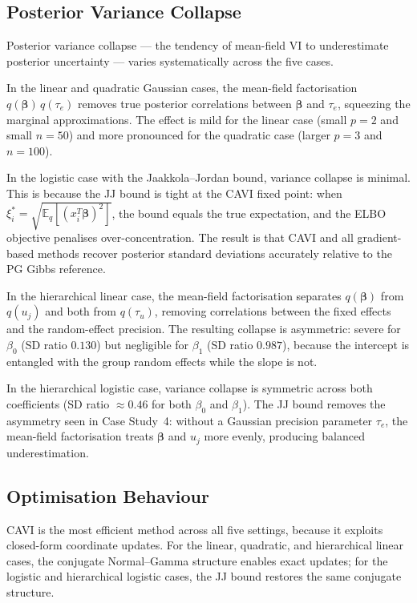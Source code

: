 \documentclass[11pt,a4paper]{article}
\newcommand{\E}{\mathbb{E}}
\begin{document}
\subsection{Posterior Variance Collapse}

Posterior variance collapse --- the tendency of mean-field VI to underestimate posterior
uncertainty --- varies systematically across the five cases.

In the linear and quadratic Gaussian cases, the mean-field factorisation
$q(\bm{\beta})\,q(\tau_e)$ removes true posterior correlations between $\bm{\beta}$ and
$\tau_e$, squeezing the marginal approximations.
The effect is mild for the linear case (small $p=2$ and small $n=50$) and more pronounced
for the quadratic case (larger $p=3$ and $n=100$).

In the logistic case with the Jaakkola--Jordan bound, variance collapse is minimal.
This is because the JJ bound is tight at the CAVI fixed point: when
$\xi_i^* = \sqrt{\E_q[(x_i^T\bm{\beta})^2]}$, the bound equals the true expectation,
and the ELBO objective penalises over-concentration.
The result is that CAVI and all gradient-based methods recover posterior standard
deviations accurately relative to the PG Gibbs reference.

In the hierarchical linear case, the mean-field factorisation separates $q(\bm{\beta})$
from $q(u_j)$ and both from $q(\tau_u)$, removing correlations between the fixed
effects and the random-effect precision.
The resulting collapse is asymmetric: severe for $\beta_0$ (SD ratio $0.130$) but
negligible for $\beta_1$ (SD ratio $0.987$), because the intercept is entangled
with the group random effects while the slope is not.

In the hierarchical logistic case, variance collapse is symmetric across both
coefficients (SD ratio $\approx 0.46$ for both $\beta_0$ and $\beta_1$).
The JJ bound removes the asymmetry seen in Case Study~4: without a Gaussian precision
parameter $\tau_e$, the mean-field factorisation treats $\bm{\beta}$ and $u_j$ more
evenly, producing balanced underestimation.

\subsection{Optimisation Behaviour}

CAVI is the most efficient method across all five settings, because it exploits
closed-form coordinate updates.
For the linear, quadratic, and hierarchical linear cases, the conjugate Normal--Gamma
structure enables exact updates; for the logistic and hierarchical logistic cases,
the JJ bound restores the same conjugate structure.
\end{document}

